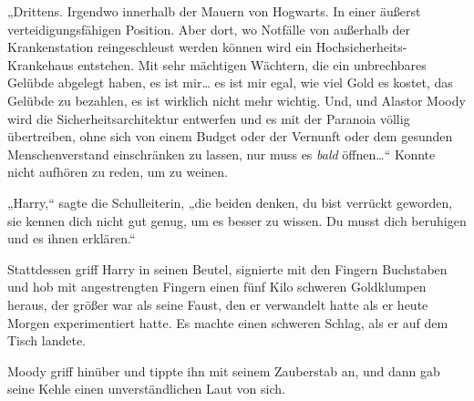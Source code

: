 „Drittens. Irgendwo innerhalb der Mauern von Hogwarts. In einer äußerst verteidigungsfähigen Position. Aber dort, wo Notfälle von außerhalb der Krankenstation reingeschleust werden können wird ein Hochsicherheits-Krankehaus entstehen. Mit sehr mächtigen Wächtern, die ein unbrechbares Gelübde abgelegt haben, es ist mir… es ist mir egal, wie viel Gold es kostet, das Gelübde zu bezahlen, es ist wirklich nicht mehr wichtig. Und, und Alastor Moody wird die Sicherheitsarchitektur entwerfen und es mit der Paranoia völlig übertreiben, ohne sich von einem Budget oder der Vernunft oder dem gesunden Menschenverstand einschränken zu lassen, nur muss es \emph{bald} öffnen…“ Konnte nicht aufhören zu reden, um zu weinen.

„Harry,“ sagte die Schulleiterin, „die beiden denken, du bist verrückt geworden, sie kennen dich nicht gut genug, um es besser zu wissen. Du musst dich beruhigen und es ihnen erklären.“

Stattdessen griff Harry in seinen Beutel, signierte mit den Fingern Buchstaben und hob mit angestrengten Fingern einen fünf Kilo schweren Goldklumpen heraus, der größer war als seine Faust, den er verwandelt hatte als er heute Morgen experimentiert hatte. Es machte einen schweren Schlag, als er auf dem Tisch landete.

Moody griff hinüber und tippte ihn mit seinem Zauberstab an, und dann gab seine Kehle einen unverständlichen Laut von sich.

